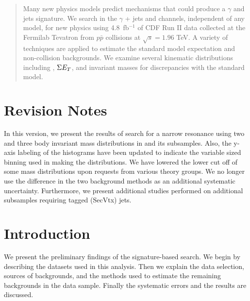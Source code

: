 \documentclass[11pt]{article}
\begin{document}
\def\newpage{\par\penalty 100} %
\maketitle
\def\newpage{\par\vfill\penalty -10000} %

\begin{abstract}
\noindent
Many new physics models predict mechanisms that could produce a $\gamma$ and jets signature.  We search in the $\gamma$ + jets and \phojetsmet channels, independent of any model, for new physics using 4.8~fb$^{-1}$  of CDF Run II data collected at the Fermilab Tevatron from $p\bar{p}$ collisions at $\sqrt{s} = 1.96$ TeV. A variety of techniques are applied to estimate the standard model expectation and non-collision backgrounds. We examine several kinematic distributions including \met, $\Sigma \mbox{$E_T$}$, and invariant masses for discrepancies with the standard model.
\end{abstract}

\pagestyle{plain}

\section{Revision Notes}
In this version, we present the results of search for a narrow resonance using two and three body invariant mass distributions in \phoonejet and its subsamples. Also, the y-axis labeling of the histograms have been updated to indicate the variable sized binning used in making the distributions. We have lowered the lower cut off of some mass distributions upon requests from various theory groups. We no longer use the difference in the two background methods as an additional systematic uncertainty. Furthermore, we present additional studies performed on additional subsamples requiring tagged (SecVtx) jets.

\section{Introduction}
We present the preliminary findings of  the \phojetsmet signature-based search. We begin by describing the datasets used in this analysis. Then we explain the data selection, sources of backgrounds, and the methods used to estimate the remaining backgrounds in the data sample. Finally the systematic errors and the results are discussed.
\end{document}
